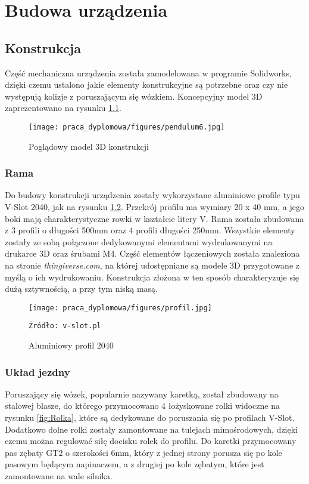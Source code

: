 \chapter{Budowa urządzenia}

\section{Konstrukcja}

Część mechaniczna urządzenia została zamodelowana w programie Solidworks, dzięki czemu ustalono jakie elementy konstrukcyjne są potrzebne oraz czy nie występują kolizje z poruszającym się wózkiem. Koncepcyjny model 3D zaprezentowano na rysunku \ref{fig:konstrukcja}. 

\begin{figure}
    \centering
    \texttt{[image: praca\_dyplomowa/figures/pendulum6.jpg]}
    \caption{Poglądowy model 3D konstrukcji}
    \label{fig:konstrukcja}
\end{figure}

\subsection{Rama}
Do budowy konstrukcji urządzenia zostały wykorzystane aluminiowe profile typu V-Slot 2040, jak na rysunku \ref{fig:profil}. Przekrój profilu ma wymiary 20 x 40 mm, a jego boki mają charakterystyczne rowki w kształcie litery V. Rama została zbudowana z 3 profili o długości 500mm oraz 4 profili długości 250mm. Wszystkie elementy zostały ze sobą połączone dedykowanymi elementami wydrukowanymi na drukarce 3D oraz śrubami M4. Część elementów łączeniowych została znaleziona na stronie \textit{thingiverse.com}, na której udostępniane są modele 3D przygotowane z myślą o ich wydrukowaniu. Konstrukcja złożona w ten sposób charakteryzuje się dużą sztywnością, a przy tym niską masą.

\begin{figure}
    \centering
    \texttt{[image: praca\_dyplomowa/figures/profil.jpg]}
    \caption{Aluminiowy profil 2040}
    \texttt{Źródło: v-slot.pl}
    \label{fig:profil}
\end{figure}

\subsection{Układ jezdny}
Poruszający się wózek, popularnie nazywany karetką, został zbudowany na stalowej blasze, do którego przymocowano 4 łożyskowane rolki widoczne na rysunku \ref{fig:Rolka}, które są dedykowane do poruszania się po profilach V-Slot. Dodatkowo dolne rolki zostały zamontowane na tulejach mimośrodowych, dzięki czemu można regulować siłę docisku rolek do profilu. Do karetki przymocowany pas zębaty GT2 o szerokości 6mm, który z jednej strony porusza się po kole pasowym będącym napinaczem, a z drugiej po kole zębatym, które jest zamontowane na wale silnika. 

